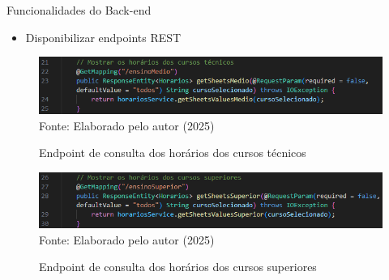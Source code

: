 \begin{frame}{Funcionalidades do Back-end}
    \begin{itemize}
        \item Disponibilizar endpoints REST
    \end{itemize}
    \begin{figure}
        \centering
        \vspace{-0.3cm}
        \caption{Endpoint de consulta dos horários dos cursos técnicos}
        \vspace{-0.2cm}
        \includegraphics[width=1\textwidth]{figuras/back-3.png}
        \\ %
        \footnotesize Fonte: Elaborado pelo autor (2025)
    \end{figure}
    \begin{figure}
        \centering
        \vspace{-0.5cm}
        \caption{Endpoint de consulta dos horários dos cursos superiores}
        \vspace{-0.2cm}
        \includegraphics[width=1\textwidth]{figuras/back-4.png}
        \\ %
        \footnotesize Fonte: Elaborado pelo autor (2025)
    \end{figure}
\end{frame}

